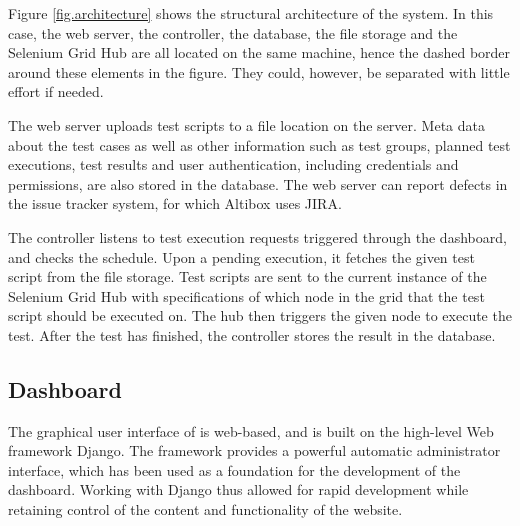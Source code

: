 Figure \ref{fig.architecture} shows the structural architecture of the system. In this case, the web server, the controller, the database, the file storage and the Selenium Grid Hub are all located on the same machine, hence the dashed border around these elements in the figure. They could, however, be separated with little effort if needed.

The web server uploads test scripts to a file location on the server. Meta data about the test cases as well as other information such as test groups, planned test executions, test results and user authentication, including credentials and permissions, are also stored in the database. The web server can report defects in the issue tracker system, for which Altibox uses JIRA.

The controller listens to test execution requests triggered through the dashboard, and checks the schedule. Upon a pending execution, it fetches the given test script from the file storage. Test scripts are sent to the current instance of the Selenium Grid Hub with specifications of which node in the grid that the test script should be executed on. The hub then triggers the given node to execute the test. After the test has finished, the controller stores the result in the database.















\subsection{Dashboard}
The graphical user interface of \toolname \space is web-based, and is built on the high-level Web framework Django. The framework provides a powerful automatic administrator interface, which has been used as a foundation for the development of the dashboard. Working with Django thus allowed for rapid development while retaining control of the content and functionality of the website.

